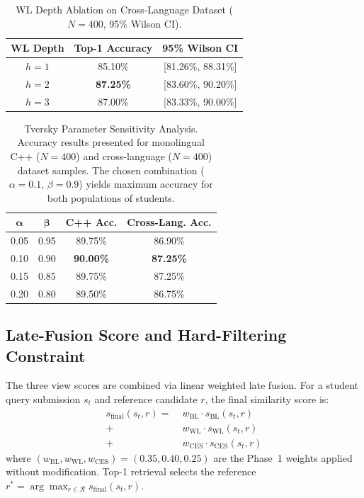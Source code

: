 \begin{table}[ht]
\caption{WL Depth Ablation on Cross-Language Dataset ($N=400$, 95\% Wilson CI).}
\label{tab:wl_ablation}
\centering
\begin{tabular}{|c|c|c|}
\hline
\textbf{WL Depth} & \textbf{Top-1 Accuracy} & \textbf{95\% Wilson CI} \\
\hline
$h=1$ & 85.10\% & [81.26\%, 88.31\%] \\
$h=2$ & \textbf{87.25\%} & [83.60\%, 90.20\%] \\
$h=3$ & 87.00\% & [83.33\%, 90.00\%] \\
\hline
\end{tabular}
\end{table}

\begin{table}[ht]
\caption{Tversky Parameter Sensitivity Analysis. Accuracy results presented for monolingual C++ ($N=400$) and cross-language ($N=400$) dataset samples. The chosen combination ($\alpha{=}0.1$, $\beta{=}0.9$) yields maximum accuracy for both populations of students.}
\label{tab:tversky_sensitivity}
\centering
\begin{tabular}{|c|c|c|c|}
\hline
$\boldsymbol{\alpha}$ & $\boldsymbol{\beta}$ & \textbf{C++ Acc.} & \textbf{Cross-Lang. Acc.} \\
\hline
0.05 & 0.95 & 89.75\% & 86.90\% \\
0.10 & 0.90 & \textbf{90.00\%} & \textbf{87.25\%} \\
0.15 & 0.85 & 89.75\% & 87.25\% \\
0.20 & 0.80 & 89.50\% & 86.75\% \\
\hline
\end{tabular}
\end{table}

\subsection{Late-Fusion Score and Hard-Filtering Constraint}
\label{subsec:late_fusion}

The three view scores are combined via linear weighted late fusion. For a student query submission $s_t$ and reference candidate $r$, the final similarity score is:
\begin{equation}
\begin{split}
    s_{\text{final}}(s_t, r) = &\; w_{\text{BL}} \cdot s_{\text{BL}}(s_t, r) \\
                               +&\; w_{\text{WL}} \cdot s_{\text{WL}}(s_t, r) \\
                               +&\; w_{\text{CES}} \cdot s_{\text{CES}}(s_t, r)
\end{split}
\end{equation}
where $(w_{\text{BL}}, w_{\text{WL}}, w_{\text{CES}}) = (0.35, 0.40, 0.25)$ are the Phase~1 weights applied without modification. Top-1 retrieval selects the reference $r^* = \arg\max_{r \in \mathcal{R}} s_{\text{final}}(s_t, r)$.

